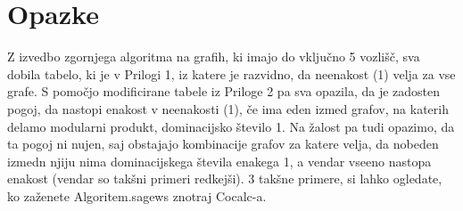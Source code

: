 \documentclass[a4paper,12pt]{article}
\begin{document}
\section{Opazke}
Z izvedbo zgornjega algoritma na grafih, ki imajo do vključno 5 vozlišč, sva dobila tabelo, ki je v Prilogi 1, iz katere je razvidno, da neenakost (1) velja za vse grafe.
S pomočjo modificirane tabele iz Priloge 2 pa sva opazila, da je zadosten pogoj, da nastopi enakost v neenakosti (1), če ima eden izmed grafov, na katerih delamo modularni produkt,
dominacijsko število 1. Na žalost pa tudi opazimo, da ta pogoj ni nujen, saj obstajajo kombinacije grafov za katere velja, da nobeden izmedn njiju nima dominacijskega števila enakega 1,
a vendar vseeno nastopa enakost (vendar so takšni primeri redkejši). 3 takšne primere, si lahko ogledate, ko zaženete Algoritem.sagews znotraj Cocalc-a.
\end{document}
